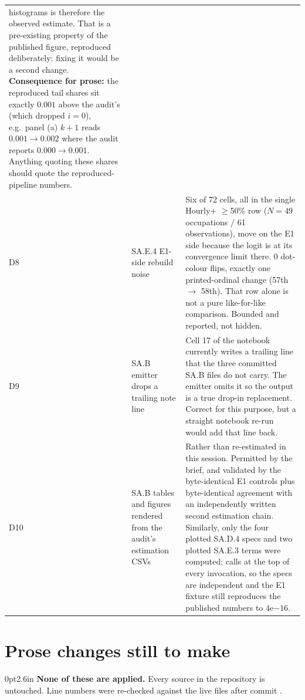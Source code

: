 \documentclass[10pt]{article}
\newcommand{\file}[1]{{\ttfamily\detokenize{#1}}}
\newcommand{\ra}{\ensuremath{\rightarrow}}
\newenvironment{prose}{\begin{adjustwidth}{0pt}{2.6in}}{\end{adjustwidth}}
\begin{document}
{\begin{longtable}{@{}p{0.7cm}p{4.2cm}p{15.5cm}@{}}
histograms is therefore the observed estimate. That is a pre-existing property of the published
figure, reproduced deliberately: fixing it would be a second change. \textbf{Consequence for prose:}
the reproduced tail shares sit exactly $0.001$ above the audit's (which dropped $i=0$), e.g.\ panel (a)
$k{+}1$ reads $0.001 \ra 0.002$ where the audit reports $0.000 \ra 0.001$. Anything quoting these
shares should quote the reproduced-pipeline numbers. \\
\addlinespace
D8 & SA.E.4 E1-side rebuild noise &
Six of 72 cells, all in the single Hourly$+$ $\geq$50\% row ($N=49$ occupations / 61 observations),
move on the E1 side because the logit is at its convergence limit there. 0 dot-colour flips, exactly
one printed-ordinal change (57th \ra{} 58th). That row alone is not a pure like-for-like comparison.
Bounded and reported, not hidden. \\
\addlinespace
D9 & SA.B \file{.tex} emitter drops a trailing note line &
Cell 17 of the notebook currently writes a trailing
\file{\footnotesize{Clustered standard errors in parentheses...}} line that the three committed SA.B
files do not carry. The emitter omits it so the output is a true drop-in replacement. Correct for this
purpose, but a straight notebook re-run would add that line back. \\
\addlinespace
D10 & SA.B tables and figures rendered from the audit's estimation CSVs &
Rather than re-estimated in this session. Permitted by the brief, and validated by the byte-identical
E1 controls plus byte-identical agreement with an independently written second estimation chain.
Similarly, only the four plotted SA.D.4 specs and two plotted SA.E.3 terms were computed;
\file{build_ame_df} calls \file{np.random.seed(123)} at the top of every invocation, so the specs are
independent and the E1 fixture still reproduces the published numbers to $4\mathrm{e}{-16}$. \\
\bottomrule
\end{longtable}
}

\clearpage
\section{Prose changes still to make}\label{sec:prose}

\begin{prose}
\textbf{None of these are applied.} Every \file{.tex} source in the repository is untouched. Line
numbers were re-checked against the live files after commit \file{1d64cb0}.
\end{prose}
\end{document}
